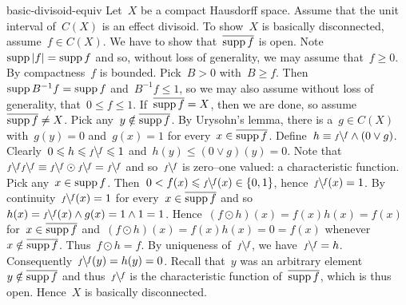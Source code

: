 \begin{solution}{basic-divisoid-equiv}%
Let~$X$ be a compact Hausdorff space.
Assume that the unit interval of~$C(X)$
    is an effect divisoid.
To show~$X$ is basically disconnected,
    assume~$f \in C(X)$.
We have to show that~$\overline{\operatorname{supp} f}$ is open.
Note~$\operatorname{supp} | f | = \operatorname{supp}  f$ and so, without loss of generality,
    we may assume that~$f \geq 0$.
By compactness~$f$ is bounded.  Pick~$B > 0$ with~$B \geq f$.
    Then~$\operatorname{supp} B^{-1} f = \operatorname{supp} f$ and~$B^{-1} f \leq 1$,
    so we may also assume without loss of generality, that~$0 \leq f \leq 1$.
    If~$\overline{\operatorname{supp} f} = X$, then we are done,
    so assume~$\overline{\operatorname{supp} f} \neq X$.
    Pick any~$y \notin \overline{\operatorname{supp} f}$.
By Urysohn's lemma, there is a~$g \in C(X)$
    with~$g(y) = 0$ and~$g(x) = 1$ for every~$x \in \overline{\operatorname{supp} f}$.
    Define~$h \equiv  \rfrac{f}{f} \wedge (0 \vee g)$.
Clearly~$0 \leq h \leq \rfrac{f}{f} \leq 1$
    and~$h(y) \leq (0 \vee g)(y) = 0$.
    Note that~$\rfrac{f}{f}\rfrac{f}{f} \equiv  \rfrac{f}{f} \odot \rfrac{f}{f} = \rfrac{f}{f}$
    and so~$\rfrac{f}{f}$ is zero--one valued: a characteristic function.
Pick any~$x \in \operatorname{supp} f$.
    Then~$0 < f(x) \leq \rfrac{f}{f}(x) \in \{0,1\}$,
        hence~$\rfrac{f}{f}(x)=1$.
    By continuity~$\rfrac{f}{f}(x)=1$
        for every~$x \in \overline{\operatorname{supp} f}$
            and so~$h(x) = \rfrac{f}{f}(x) \wedge g(x) = 1 \wedge 1 = 1$.
Hence~$(f \odot h) (x) = f(x)h(x) = f(x)$ for~$x \in \overline{\operatorname{supp} f}$
    and~$(f \odot h)(x) = f(x)h(x) = 0 = f(x)$ whenever~$x \notin \overline{\operatorname{supp} f}$.
Thus~$f \odot h = f$.
    By uniqueness of~$\rfrac{f}{f}$, we have~$\rfrac{f}{f} = h$.
    Consequently~$\rfrac{f}{f}(y) = h(y) = 0$.
    Recall that~$y$ was an arbitrary element~$y \notin \overline{\operatorname{supp} f}$
        and thus~$\rfrac{f}{f}$ is the characteristic function of~$\overline{\operatorname{supp} f}$,
            which is thus open. Hence~$X$ is basically disconnected.


\end{solution}
